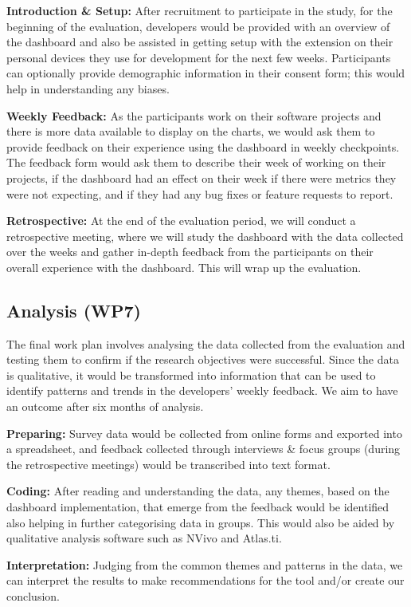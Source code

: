 \documentclass{prrcs}
\begin{document}
\textbf{Introduction \& Setup:} After recruitment to participate in the study, for the beginning of the evaluation, developers would be provided with an overview of the dashboard and also be assisted in getting setup with the extension on their personal devices they use for development for the next few weeks. Participants can optionally provide demographic information in their consent form; this would help in understanding any biases.

\textbf{Weekly Feedback:} As the participants work on their software projects and there is more data available to display on the charts, we would ask them to provide feedback on their experience using the dashboard in weekly checkpoints. The feedback form would ask them to describe their week of working on their projects, if the dashboard had an effect on their week if there were metrics they were not expecting, and if they had any bug fixes or feature requests to report.

\textbf{Retrospective:} At the end of the evaluation period, we will conduct a retrospective meeting, where we will study the dashboard with the data collected over the weeks and gather in-depth feedback from the participants on their overall experience with the dashboard. This will wrap up the evaluation.

\subsection*{Analysis (WP7)}

The final work plan involves analysing the data collected from the evaluation and testing them to confirm if the research objectives were successful. Since the data is qualitative, it would be transformed into information that can be used to identify patterns and trends in the developers' weekly feedback. We aim to have an outcome after six months of analysis.

\textbf{Preparing:} Survey data would be collected from online forms and exported into a spreadsheet, and feedback collected through interviews \& focus groups (during the retrospective meetings) would be transcribed into text format.

\textbf{Coding:} After reading and understanding the data, any themes, based on the dashboard implementation, that emerge from the feedback would be identified also helping in further categorising data in groups. This would also be aided by qualitative analysis software such as NVivo and Atlas.ti.

\textbf{Interpretation:} Judging from the common themes and patterns in the data, we can interpret the results to make recommendations for the tool and/or create our conclusion.
\end{document}
